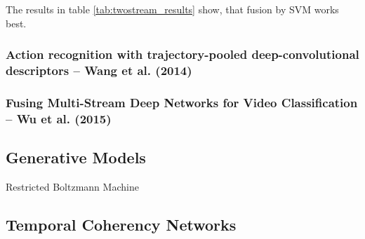The results in table \ref{tab:twostream_results} show, that fusion by SVM works best.

\subsubsection{Action recognition with trajectory-pooled deep-convolutional descriptors -- Wang et al. (2014)}

\subsubsection{Fusing Multi-Stream Deep Networks for Video Classification -- Wu et al. (2015)}

\subsection{Generative Models}
Restricted Boltzmann Machine

\subsection{Temporal Coherency Networks}
